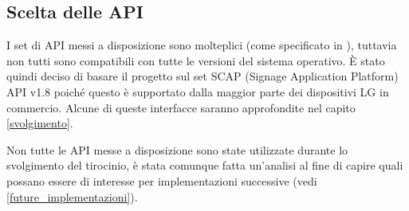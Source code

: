 
\subsection{Scelta delle API} \label{api}


I set di API messi a disposizione sono molteplici (come specificato in \cite{LgDoc}), tuttavia non tutti sono compatibili con tutte le versioni del sistema operativo. È stato quindi deciso di basare il progetto sul set SCAP (Signage Application Platform) API v1.8 poiché questo è supportato dalla maggior parte dei dispositivi LG in commercio. Alcune di queste interfacce saranno approfondite nel capito \ref*{svolgimento}.

Non tutte le API messe a disposizione sono state utilizzate durante lo svolgimento del tirocinio, è stata comunque fatta un'analisi al fine di capire quali possano essere di interesse per implementazioni successive (vedi \ref*{future_implementazioni}).
